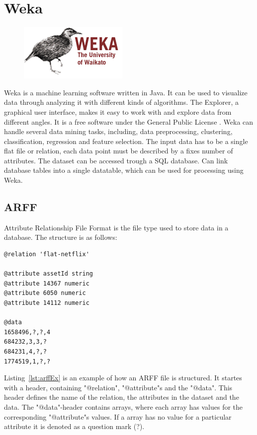 \section{Weka}

\begin{figure}
\vspace{-30pt}
\centering
\includegraphics[width = .25\textwidth]{image/Weka-logo.png}
\end{figure}


Weka is a machine learning software written in Java. It can be used to visualize data through analyzing it with different kinds of algorithms. The Explorer, a graphical user interface, makes it easy to work with and explore data from different angles. It is a free software under the General Public License \cite{GNU}. Weka can handle several data mining tasks, including, data preprocessing, clustering, classification, regression and feature selection. The input data has to be a single flat file or relation, each data point must be described by a fixes number of attributes. The dataset can be accessed trough a SQL database. Can link database tables into a single datatable, which can be used for processing using Weka.


\subsection{ARFF}
Attribute Relationship File Format is the file type used to store data in a database. The structure is as follows:

\begin{lstlisting}[caption={ARFF Example},label={lst:arffEx},captionpos=b]
@relation 'flat-netflix'

@attribute assetId string
@attribute 14367 numeric
@attribute 6050 numeric
@attribute 14112 numeric

@data
1658496,?,?,4
684232,3,3,?
684231,4,?,?
1774519,1,?,?
\end{lstlisting}

Listing~\ref{lst:arffEx} is an example of how an ARFF file is structured. It startes with a header, containing "@relation", "@attribute"s and the "@data". This header defines the name of the relation, the attributes in the dataset and the data. The "@data"-header contains arrays, where each array has values for the corresponding "@attribute"s values. If a array has no value for a particular attribute it is denoted as a question mark (?).

